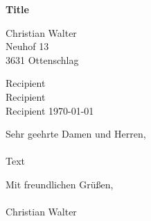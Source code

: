 \documentclass[11pt, a4paper]{article}
\begin{document}
\begin{center}
  \textbf{\Large{Title}}
\end{center}

\vspace{1cm}
Christian Walter\\
Neuhof 13\\
3631 Ottenschlag\\
\vspace{1cm}

Recipient\\
Recipient\\
Recipient
\hfill
\today\\
\vspace{1cm}

Sehr geehrte Damen und Herren,\\\\
Text

Mit freundlichen Grüßen,\\\\ Christian Walter
\end{document}
